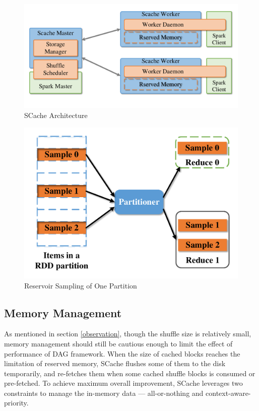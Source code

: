 \begin{figure}
	\centering
	\includegraphics[width=0.9\linewidth]{fig/arch}
	\caption{SCache Architecture}
	\label{fig:arch}
\end{figure}
\begin{figure}
	\centering
	\includegraphics[width=0.6\linewidth]{fig/sample}
	\caption{Reservoir Sampling of One Partition}
	\label{fig:sample}
\end{figure}

\subsection{Memory Management}\label{memorymanage}
As mentioned in section \ref{observation}, though the shuffle size is relatively small, memory management should still be cautious enough to limit the effect of performance of DAG framework.
When the size of cached blocks reaches the limitation of reserved memory, SCache flushes some of them to the disk temporarily, and re-fetches them when some cached shuffle blocks is consumed or pre-fetched. To achieve maximum overall improvement, SCache leverages two constraints to manage the in-memory data --- all-or-nothing and context-aware-priority.

